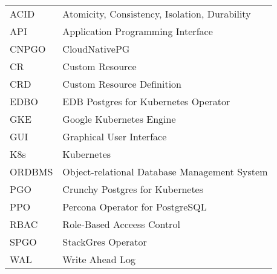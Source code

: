 
\seznamzkr

\begin{tabular}{ll}
  ACID   & Atomicity, Consistency, Isolation, Durability \\
  API    & Application Programming Interface             \\
  CNPGO  & CloudNativePG                                 \\
  CR     & Custom Resource                               \\
  CRD    & Custom Resource Definition                    \\
  EDBO   & EDB Postgres for Kubernetes Operator          \\
  GKE    & Google Kubernetes Engine                      \\
  GUI    & Graphical User Interface                      \\
  K8s    & Kubernetes                                    \\
  ORDBMS & Object-relational Database Management System  \\
  PGO    & Crunchy Postgres for Kubernetes               \\
  PPO    & Percona Operator for PostgreSQL               \\
  RBAC   & Role-Based Acceess Control                    \\
  SPGO   & StackGres Operator                            \\
  WAL    & Write Ahead Log                               \\
\end{tabular}


